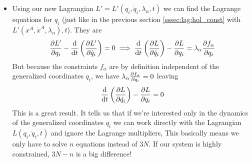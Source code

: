 \documentclass[11pt, a4paper]{article}
\begin{document}
\begin{itemize}
	\item Using our new Lagrangian $ L' = L'(q_{i}, \dot{q}_{i}, \lambda_{\alpha}, t) $ we can find the Lagrange equations for $ q_{i} $ (just like in the previous section \ref{sssec:lag:hol_const} with $ L'(x^{A}, \dot{x}^{A}, \lambda_{\alpha}), t $). They are
	\begin{equation*}
		\pdv{L'}{q_{i}} - \dv{}{t}\left(\pdv{L'}{\dot{q}_{i}} \right) = 0 \implies \dv{}{t} \left(\pdv{L}{\dot{q}_i} \right)- \pdv{L}{q_i} = \lambda_{\alpha} \pdv{f_{\alpha}}{q_i}
	\end{equation*}
	But because the constraints $ f_{\alpha} $ are by definition independent of the generalized coordinates $ q_{i} $, we have $ \lambda_{\alpha} \pdv{f_{\alpha}}{q_i} = 0 $ leaving
	\begin{equation*}
		 \dv{}{t} \left(\pdv{L}{\dot{q}_i} \right)- \pdv{L}{q_i} = 0
	\end{equation*}
	This is a great result. It tells us that if we're interested only in the dynamics of the generalized coordinates $ q_{i} $ we can work directly with the Lagrangian $ L(q_{i}, \dot{q}_{i}, t) $ and ignore the Lagrange multipliers, This basically means we only have to solve $ n $ equations instead of $ 3N $. If our system is highly constrained, $ 3N - n $ is a big difference!
	
\end{itemize}
\end{document}
